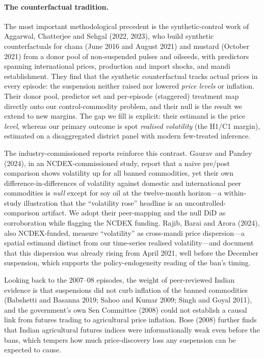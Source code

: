 \paragraph{The counterfactual tradition.} The most important methodological precedent
is the synthetic-control work of Aggarwal, Chatterjee and Sehgal (2022, 2023), who
build synthetic counterfactuals for chana (June 2016 and August 2021) and mustard
(October 2021) from a donor pool of non-suspended pulses and oilseeds, with predictors
spanning international prices, production and import shocks, and mandi establishment.
They find that the synthetic counterfactual tracks actual prices in every episode: the
suspension neither raised nor lowered \emph{price levels} or inflation. Their donor
pool, predictor set and per-episode (staggered) treatment map directly onto our
control-commodity problem, and their null is the result we extend to new margins. The
gap we fill is explicit: their estimand is the price \emph{level}, whereas our primary
outcome is spot \emph{realised volatility} (the H1/C1 margin), estimated on a
disaggregated district panel with modern few-treated inference.

The industry-commissioned reports reinforce this contrast. Gaurav and Pandey (2024),
in an NCDEX-commissioned study, report that a naive pre/post comparison shows
volatility up for all banned commodities, yet their own difference-in-differences of
volatility against domestic and international peer commodities is \emph{null} except
for soy oil at the twelve-month horizon---a within-study illustration that the
``volatility rose'' headline is an uncontrolled-comparison artifact. We adopt their
peer-mapping and the null DiD as corroboration while flagging the NCDEX funding.
Rajib, Barai and Arora (2024), also NCDEX-funded, measure ``volatility'' as
cross-mandi price dispersion---a spatial estimand distinct from our time-series
realised volatility---and document that this dispersion was already rising from April
2021, well before the December suspension, which supports the policy-endogeneity
reading of the ban's timing.

Looking back to the 2007--08 episodes, the weight of peer-reviewed Indian evidence is
that suspensions did not curb inflation of the banned commodities (Babshetti and
Basanna 2019; Sahoo and Kumar 2009; Singh and Goyal 2011), and the government's own
Sen Committee (2008) could not establish a causal link from futures trading to
agricultural price inflation. Bose (2008) further finds that Indian agricultural
futures indices were informationally weak even before the bans, which tempers how much
price-discovery loss any suspension can be expected to cause.

